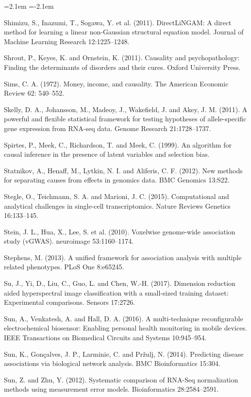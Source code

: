 \begin{list}{}{\leftmargin=2.1em  
  \itemindent=-2.1em \parsep=0pt \itemsep=2pt \topsep=0pt}
\item Shimizu, S., Inazumi, T., Sogawa, Y. et al. (2011). DirectLiNGAM: A direct method for learning a linear non-Gaussian structural equation model. Journal of Machine Learning Research 12:1225--1248.
\item Shrout, P., Keyes, K. and Ornstein, K. (2011). Causality and psychopathology: Finding the determinants of disorders and their cures. Oxford University Press.
\item Sims, C. A. (1972). Money, income, and causality. The American Economic Review 62: 540--552.
\item Skelly, D. A., Johansson, M., Madeoy, J., Wakefield, J. and Akey, J. M. (2011). A powerful and flexible statistical framework for testing hypotheses of allele-specific gene expression from RNA-seq data. Genome Research 21:1728--1737.
\item Spirtes, P., Meek, C., Richardson, T. and Meek, C. (1999). An algorithm for causal inference in the presence of latent variables and selection bias.
\item Statnikov, A., Henaff, M., Lytkin, N. I. and Aliferis, C. F. (2012). New methods for separating causes from effects in genomics data. BMC Genomics 13:S22.
\item Stegle, O., Teichmann, S. A. and Marioni, J. C. (2015). Computational and analytical challenges in single-cell transcriptomics. Nature Reviews Genetics 16:133--145.
\item Stein, J. L., Hua, X., Lee, S. et al. (2010). Voxelwise genome-wide association study (vGWAS). neuroimage 53:1160--1174.
\item Stephens, M. (2013). A unified framework for association analysis with multiple related phenotypes. PLoS One 8:e65245.
\item Su, J., Yi, D., Liu, C., Guo, L. and Chen, W.-H. (2017). Dimension reduction aided hyperspectral image classification with a small-sized training dataset: Experimental comparisons. Sensors 17:2726.
\item Sun, A., Venkatesh, A. and Hall, D. A. (2016). A multi-technique reconfigurable electrochemical biosensor: Enabling personal health monitoring in mobile devices. IEEE Transactions on Biomedical Circuits and Systems 10:945--954.
\item Sun, K., Gonçalves, J. P., Larminie, C. and Pržulj, N. (2014). Predicting disease associations via biological network analysis. BMC Bioinformatics 15:304.
\item Sun, Z. and Zhu, Y. (2012). Systematic comparison of RNA-Seq normalization methods using measurement error models. Bioinformatics 28:2584--2591.

\end{list}
